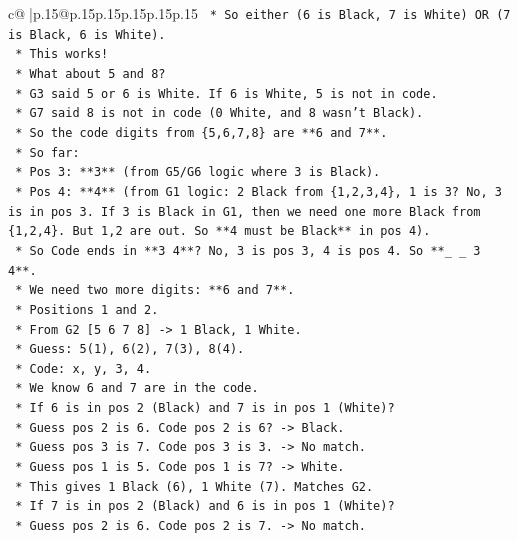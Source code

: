 \documentclass{article}
\begin{document}
{\begin{supertabular}{c@{$\;$}|p{.15\linewidth}@{}p{.15\linewidth}p{.15\linewidth}p{.15\linewidth}p{.15\linewidth}p{.15\linewidth}}
{{{\texttt{                    *   So either (6 is Black, 7 is White) OR (7 is Black, 6 is White).} \\
\texttt{                    *   This works!} \\
\texttt{                *   What about 5 and 8?} \\
\texttt{                    *   G3 said 5 or 6 is White. If 6 is White, 5 is not in code.} \\
\texttt{                    *   G7 said 8 is not in code (0 White, and 8 wasn't Black).} \\
\texttt{                    *   So the code digits from \{5,6,7,8\} are **6 and 7**.} \\
\texttt{    *   So far:} \\
\texttt{        *   Pos 3: **3** (from G5/G6 logic where 3 is Black).} \\
\texttt{        *   Pos 4: **4** (from G1 logic: 2 Black from \{1,2,3,4\}, 1 is 3? No, 3 is in pos 3. If 3 is Black in G1, then we need one more Black from \{1,2,4\}. But 1,2 are out. So **4 must be Black** in pos 4).} \\
\texttt{        *   So Code ends in **3 4**? No, 3 is pos 3, 4 is pos 4. So **\_ \_ 3 4**.} \\
\texttt{        *   We need two more digits: **6 and 7**.} \\
\texttt{        *   Positions 1 and 2.} \\
\texttt{        *   From G2 {[}5 6 7 8{]} {-}> 1 Black, 1 White.} \\
\texttt{            *   Guess: 5(1), 6(2), 7(3), 8(4).} \\
\texttt{            *   Code: x, y, 3, 4.} \\
\texttt{            *   We know 6 and 7 are in the code.} \\
\texttt{            *   If 6 is in pos 2 (Black) and 7 is in pos 1 (White)?} \\
\texttt{                *   Guess pos 2 is 6. Code pos 2 is 6? {-}> Black.} \\
\texttt{                *   Guess pos 3 is 7. Code pos 3 is 3. {-}> No match.} \\
\texttt{                *   Guess pos 1 is 5. Code pos 1 is 7? {-}> White.} \\
\texttt{                *   This gives 1 Black (6), 1 White (7). Matches G2.} \\
\texttt{            *   If 7 is in pos 2 (Black) and 6 is in pos 1 (White)?} \\
\texttt{                *   Guess pos 2 is 6. Code pos 2 is 7. {-}> No match.} \\
}}}
\end{supertabular}}
\end{document}
